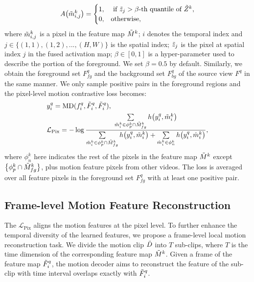 \documentclass[sigconf,screen]{acmart}
\begin{document}
\begin{equation} \label{eq6}
A\big(\Tilde{m}_{i,j}^k\big)=
\begin{cases}1, & \text { if } \Tilde{z}_j > \beta \text{-th quantile of } \Tilde{Z}^k, \\ 0, & \text{otherwise}, \end{cases}
\end{equation}
where $\Tilde{m}_{i,j}^k$ is a pixel in the feature map $\Tilde{M}^k$; $i$ denotes the temporal index and $j \in \{(1,1),(1,2),...,(H,W)\}$ is the spatial index; $\Tilde{z}_j$ is the pixel at spatial index $j$ in the fused activation map; $\beta \in [0,1]$ is a hyper-parameter used to describe the portion of the foreground. We set $\beta=0.5$ by default. Similarly, we obtain the foreground set $F_{fg}^q$ and the background set $F_{bg}^q$
 of the source view $F^q$ in the same manner. We only sample positive pairs in the foreground regions and the pixel-level motion contrastive loss becomes:
\begin{align}
& y_i^q = \mathrm{MD}(f_i^q,\Tilde{F}_i^q,\Tilde{F}_i^q), \\
& \mathcal{L}_{\mathrm{Pix}} = -\log \frac{\sum\limits_{\Tilde{m}_i^k \in \phi_p^k \cap \Tilde{M}_{fg}^k} h\big(y_i^q, \Tilde{m}_i^k\big)}{\sum\limits_{\Tilde{m}_i^k \in \phi_p^k \cap \Tilde{M}_{fg}^k} h\big(y_i^q, \Tilde{m}_i^k\big)+\sum\limits_{\hat{m}_i^k \in \phi_n^k} h\big(y_i^q, \hat{m}_i^k\big)},
\end{align}
where $\phi_n^k$ here indicates the rest of the pixels in the feature map $\Tilde{M}^k$ except $\big\{\phi_p^k \cap \Tilde{M}_{fg}^k\big\}$, plus motion feature pixels from other videos. The loss is averaged over all feature pixels in the foreground set $F_{fg}^q$ with at least one positive pair.


\subsection{Frame-level Motion Feature Reconstruction}\label{section:sec3.3}

The $\mathcal{L}_{\mathrm{Pix}}$ aligns the motion features at the pixel level. To further enhance the temporal diversity of the learned features, we propose a frame-level local motion reconstruction task. We divide the motion clip $\Tilde{D}$ into $T$ sub-clips, where $T$ is the time dimension of the corresponding feature map $\Tilde{M}^k$. Given a frame of the feature map $\Tilde{F}_i^q$, the motion decoder aims to reconstruct the feature of the sub-clip with time interval overlaps exactly with $\Tilde{F}_i^q$. 
\end{document}
